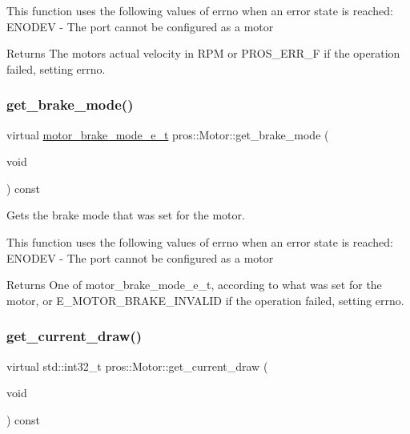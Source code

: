 This function uses the following values of errno when an error state is reached\+: E\+N\+O\+D\+EV -\/ The port cannot be configured as a motor

\begin{DoxyReturn}{Returns}
The motor\textquotesingle{}s actual velocity in R\+PM or P\+R\+O\+S\+\_\+\+E\+R\+R\+\_\+F if the operation failed, setting errno. 
\end{DoxyReturn}
\mbox{\label{classpros_1_1Motor_acc0c2225d2b713b73e1caee1a483a958}} 
\subsubsection{\texorpdfstring{get\+\_\+brake\+\_\+mode()}{get\_brake\_mode()}}
{\footnotesize\ttfamily virtual \hyperlink{motors_8h_aa324a2881696428c9e3684f9ad23a83b}{motor\+\_\+brake\+\_\+mode\+\_\+e\+\_\+t} pros\+::\+Motor\+::get\+\_\+brake\+\_\+mode (\begin{DoxyParamCaption}\item[{void}]{ }\end{DoxyParamCaption}) const\hspace{0.3cm}{\ttfamily [virtual]}}



Gets the brake mode that was set for the motor. 

This function uses the following values of errno when an error state is reached\+: E\+N\+O\+D\+EV -\/ The port cannot be configured as a motor

\begin{DoxyReturn}{Returns}
One of motor\+\_\+brake\+\_\+mode\+\_\+e\+\_\+t, according to what was set for the motor, or E\+\_\+\+M\+O\+T\+O\+R\+\_\+\+B\+R\+A\+K\+E\+\_\+\+I\+N\+V\+A\+L\+ID if the operation failed, setting errno. 
\end{DoxyReturn}
\mbox{\label{classpros_1_1Motor_a502eaf3859452721e2327e53ab3f34d8}} 
\subsubsection{\texorpdfstring{get\+\_\+current\+\_\+draw()}{get\_current\_draw()}}
{\footnotesize\ttfamily virtual std\+::int32\+\_\+t pros\+::\+Motor\+::get\+\_\+current\+\_\+draw (\begin{DoxyParamCaption}\item[{void}]{ }\end{DoxyParamCaption}) const\hspace{0.3cm}{\ttfamily [virtual]}}



